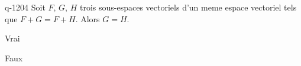 \begin{truefalse}{q-1204}
Soit $F$, $G$, $H$ trois sous-espaces vectoriels d'un meme espace vectoriel tels que $F + G = F + H$. Alors $G = H$.
\item Vrai
\item* Faux
\end{truefalse}

